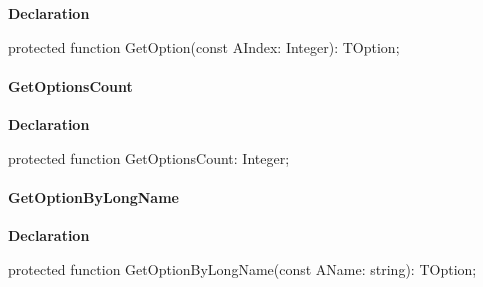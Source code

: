 \documentclass{report}
\newif\ifpdf
\begin{document}
\label{PasDoc_OptionParser.TOptionParser-GetOption}
\begin{list}{}{
\setlength{\itemindent}{0cm}
\setlength{\listparindent}{0cm}
\setlength{\leftmargin}{\evensidemargin}
\addtolength{\leftmargin}{\tmplength}
\settowidth{\labelsep}{X}
\addtolength{\leftmargin}{\labelsep}
\setlength{\labelwidth}{\tmplength}
}
\item[\textbf{Declaration}\hfill]
\ifpdf
\begin{flushleft}
\fi
\begin{ttfamily}
protected function GetOption(const AIndex: Integer): TOption;\end{ttfamily}

\ifpdf
\end{flushleft}
\fi

\end{list}
\paragraph*{GetOptionsCount}\hspace*{\fill}

\label{PasDoc_OptionParser.TOptionParser-GetOptionsCount}
\begin{list}{}{
\setlength{\itemindent}{0cm}
\setlength{\listparindent}{0cm}
\setlength{\leftmargin}{\evensidemargin}
\addtolength{\leftmargin}{\tmplength}
\settowidth{\labelsep}{X}
\addtolength{\leftmargin}{\labelsep}
\setlength{\labelwidth}{\tmplength}
}
\item[\textbf{Declaration}\hfill]
\ifpdf
\begin{flushleft}
\fi
\begin{ttfamily}
protected function GetOptionsCount: Integer;\end{ttfamily}

\ifpdf
\end{flushleft}
\fi

\end{list}
\paragraph*{GetOptionByLongName}\hspace*{\fill}

\label{PasDoc_OptionParser.TOptionParser-GetOptionByLongName}
\begin{list}{}{
\setlength{\itemindent}{0cm}
\setlength{\listparindent}{0cm}
\setlength{\leftmargin}{\evensidemargin}
\addtolength{\leftmargin}{\tmplength}
\settowidth{\labelsep}{X}
\addtolength{\leftmargin}{\labelsep}
\setlength{\labelwidth}{\tmplength}
}
\item[\textbf{Declaration}\hfill]
\ifpdf
\begin{flushleft}
\fi
\begin{ttfamily}
protected function GetOptionByLongName(const AName: string): TOption;\end{ttfamily}

\ifpdf
\end{flushleft}
\fi

\end{list}
\end{document}
